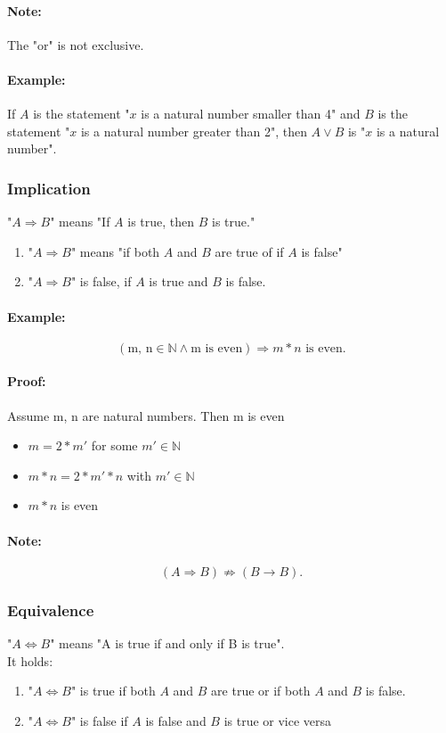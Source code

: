 \documentclass[twocolumn]{article}
\begin{document}
			\paragraph{Note:}
				The "or" is not exclusive.

			\paragraph{Example:}
				If $A$ is the statement "$x$ is a natural number smaller than
				4" and $B$ is the statement "$x$ is a natural number greater
				 than 2", then $A\vee B$ is "$x$ is a natural number".

		\subsubsection{Implication}
			"$A\Rightarrow B$" means "If $A$ is true, then $B$ is true."
			\begin{enumerate}
			\item "$A\Rightarrow B$" means "if both $A$ and $B$ are true of if $A$ 
				is false"
			\item "$A\Rightarrow B$" is false, if $A$ is true and $B$ is false.	
			\end{enumerate}

			\paragraph{Example:}
				\[
				(\mbox{m, n}\in\mathbb N\wedge\mbox{m is even})
				\Rightarrow m*n \mbox{ is even}
				.\] 
			\paragraph{Proof:}
				Assume m, n are natural numbers. Then m is even
				\begin{itemize}%
				\renewcommand{\labelitemi}{$\Rightarrow$}
				\item $m=2*m'$ for some $m'\in\mathbb N$
				\item $m*n=2*m'*n$ with $m'\in\mathbb N$
				\item $m*n$ is even				
				\end{itemize}
			\paragraph{Note:}
				\[
					(A\Rightarrow B)\not\Rightarrow(B\rightarrow B)
				.\] 

		\subsubsection{Equivalence}
			"$A\Leftrightarrow B$" means "A is true if and only if B is true".\\
			It holds:
			\begin{enumerate}
			\item "$A\Leftrightarrow B$" is true if both $A$ and $B$ are true
				or if both $A$ and $B$ is false.
			\item "$A\Leftrightarrow B$" is false if $A$ is false and $B$
				is true or vice versa
			\end{enumerate}
\end{document}
